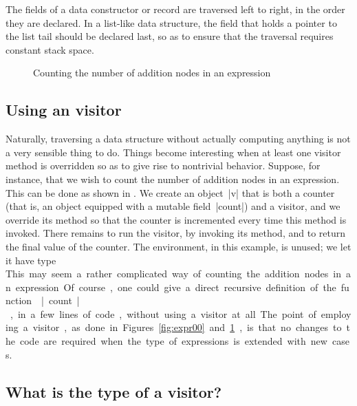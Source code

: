 \documentclass[11pt,a4paper,twoside]{article}
\begin{document}

The fields of a data constructor or record are traversed left to right, in the
order they are declared. In a list-like data structure, the field that holds a
pointer to the list tail should be declared last, so as to ensure that the
traversal requires constant stack space.


\begin{figure}[t]
\caption{Counting the number of addition nodes in an expression}
\label{fig:expr04}
\end{figure}

\subsection{Using an \iter visitor}
\label{sec:intro:iter:usage}

Naturally, traversing a data structure without actually computing anything is
not a very sensible thing to do. Things become interesting when at least one
visitor method is overridden so as to give rise to nontrivial behavior.
Suppose, for instance, that we wish to count the number of addition nodes in
an expression. This can be done as shown in . We create an
object~\oc|v| that is both a counter (that is, an object equipped with a
mutable field~\oc|count|) and a visitor, and we override its method
 so that the counter is incremented every time this
method is invoked. There remains to run the visitor, by invoking its
 method, and to return the final value of the counter. The
environment, in this example, is unused; we let it have type \unit.

This may seem a rather complicated way of counting the addition nodes in an
expression. Of course, one could give a direct recursive definition of the
function \oc|count|, in a few lines of code, without using a visitor at all.
The point of employing a visitor, as done in Figures~\ref{fig:expr00}
and~\ref{fig:expr04}, is that no changes to the code are required when the
type of expressions is extended with new cases.


\subsection{What is the type of a visitor?}
\label{sec:intro:type}
\end{document}

